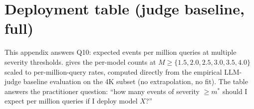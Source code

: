 \documentclass{article}
\begin{document}
\section{Deployment table (judge baseline, full)}\label{app:deployment}

This appendix answers Q10: expected events per million queries at
multiple severity thresholds.  gives the
per-model counts at $M \geq \{1.5, 2.0, 2.5, 3.0, 3.5, 4.0\}$
scaled to per-million-query rates, computed directly from the
empirical LLM-judge baseline evaluation on the 4K subset (no
extrapolation, no fit).
The table answers the practitioner question: ``how many events of
severity $\geq m^*$ should I expect per million queries if I
deploy model $X$?''
\end{document}

